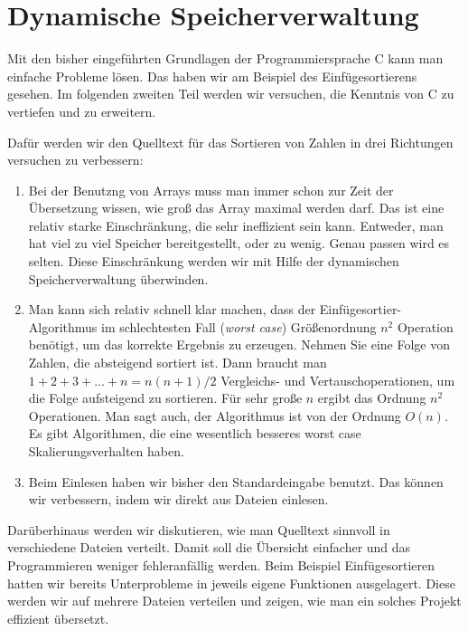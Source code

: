 \section{Dynamische Speicherverwaltung}
Mit den bisher eingeführten Grundlagen der Programmiersprache C kann man einfache Probleme lösen.
Das haben wir am Beispiel des Einfügesortierens gesehen.
Im folgenden zweiten Teil werden wir versuchen, die Kenntnis von C zu vertiefen und zu erweitern.

Dafür werden wir den Quelltext für das Sortieren von Zahlen in drei Richtungen versuchen zu verbessern:
\begin{enumerate}
\item Bei der Benutzng von Arrays muss man immer schon zur Zeit der Übersetzung wissen, wie groß das Array maximal werden darf.
  Das ist eine relativ starke Einschränkung, die sehr ineffizient sein kann.
  Entweder, man hat viel zu viel Speicher bereitgestellt, oder zu wenig.
  Genau passen wird es selten.
  Diese Einschränkung werden wir mit Hilfe der dynamischen Speicherverwaltung überwinden.

\item Man kann sich relativ schnell klar machen, dass der Einfügesortier-Algorithmus im schlechtesten Fall (\emph{worst case}) Größenordnung $n^2$ Operation benötigt, um das korrekte Ergebnis zu erzeugen.
  Nehmen Sie eine Folge von Zahlen, die absteigend sortiert ist.
  Dann braucht man $1 + 2 + 3 + ... + n = n(n+1)/2$ Vergleichs- und Vertauschoperationen, um die Folge aufsteigend zu sortieren.
  Für sehr große $n$ ergibt das Ordnung $n^2$ Operationen.
  Man sagt auch, der Algorithmus ist von der Ordnung $O(n)$.
  Es gibt Algorithmen, die eine wesentlich besseres worst case Skalierungsverhalten haben. 

\item Beim Einlesen haben wir bisher den Standardeingabe benutzt.
  Das können wir verbessern, indem wir direkt aus Dateien einlesen.
\end{enumerate}
Darüberhinaus werden wir diskutieren, wie man Quelltext sinnvoll in verschiedene Dateien verteilt.
Damit soll die Übersicht einfacher und das Programmieren weniger fehleranfällig werden.
Beim Beispiel Einfügesortieren hatten wir bereits Unterprobleme in jeweils eigene Funktionen ausgelagert.
Diese werden wir auf mehrere Dateien verteilen und zeigen, wie man ein solches Projekt effizient übersetzt.

